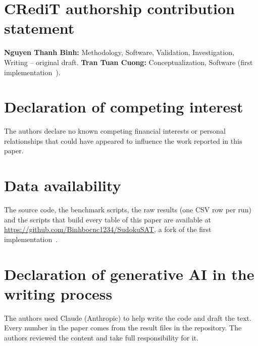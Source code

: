 \section*{CRediT authorship contribution statement}
\textbf{Nguyen Thanh Binh:} Methodology, Software, Validation, Investigation, Writing -- original draft. \textbf{Tran Tuan Cuong:} Conceptualization, Software (first implementation~\cite{cuong2026}).

\section*{Declaration of competing interest}
The authors declare no known competing financial interests or personal relationships that could have appeared to influence the work reported in this paper.

\section*{Data availability}
The source code, the benchmark scripts, the raw results (one CSV row per run) and the scripts that build every table of this paper are available at \url{https://github.com/Binhbocnc1234/SudokuSAT}, a fork of the first implementation~\cite{cuong2026}.

\section*{Declaration of generative AI in the writing process}
The authors used Claude (Anthropic) to help write the code and draft the text. Every number in the paper comes from the result files in the repository. The authors reviewed the content and take full responsibility for it.

